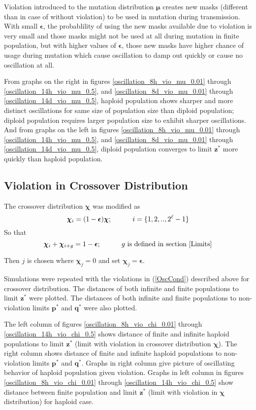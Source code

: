 Violation introduced to the mutation distribution $\bm{\mu}$ creates new masks (different than in case of without violation) to be used in mutation 
during transmission. With small $\bm{\epsilon}$, the probablility of using the new masks available due to violation is very small and 
those masks might not be used at all during mutation in finite population, but with higher values of $\bm{\epsilon}$, 
those new masks have higher chance of usage during mutation which cause oscillation to damp out quickly or cause no oscillation at all.

From graphs on the right in 
figures \ref{oscillation_8h_vio_mu_0.01} through \ref{oscillation_14h_vio_mu_0.5}, 
and \ref{oscillation_8d_vio_mu_0.01} through \ref{oscillation_14d_vio_mu_0.5}, haploid population shows sharper and 
more distinct oscillations for same size of population size than diploid population; diploid population 
requires larger population size to exhibit sharper oscillations. 
And from graphs on the left in figures \ref{oscillation_8h_vio_mu_0.01} through \ref{oscillation_14h_vio_mu_0.5}, and \ref{oscillation_8d_vio_mu_0.01} through \ref{oscillation_14d_vio_mu_0.5}, diploid population converges to limit $\bm{z}^\ast$ more quickly than haploid population. 

\subsection{Violation in Crossover Distribution}
The crossover distribution $\bm{\chi}$ was modified as
\[
\bm{\chi}_i = (1-\bm{\epsilon}) \bm{\chi} ; \hspace{30pt} i = \{1, 2,.., 2^{\ell}-1\} 
\]
So that 
\[
\bm{\chi}_i + \bm{\chi}_{i+g} = 1-\bm{\epsilon} ; \hspace{30pt} g \text{ is defined in  section } \ref{Limits}
\]

Then $j$ is chosen where $\bm{\chi}_j = 0$ and set $\bm{\chi}_j = \bm{\epsilon}$. 

Simulations were repeated with the violations in (\ref{OscCond}) described above for crossover distribution.
The distances of both infinite and finite populations to limit $\bm{z}^\ast$ were plotted. 
The distances of both infinite and finite populations to non-violation limits $\bm{p}^\ast$ and $\bm{q}^\ast$ were also plotted.


The left column of figures \ref{oscillation_8h_vio_chi_0.01} through \ref{oscillation_14h_vio_chi_0.5} 
shows distance of finite and infinite haploid populations to limit $\bm{z^\ast}$ (limit with violation in crossover distribution $\bm{\chi}$). The 
right column shows distance of finite and infinite haploid populations to non-violation limits $\bm{p^\ast}$ and $\bm{q^\ast}$. 
Graphs in right column give picture of oscillating behavior of haploid population given violation. 
Graphs in left column in figures \ref{oscillation_8h_vio_chi_0.01} through \ref{oscillation_14h_vio_chi_0.5} show distance 
between finite population and limit $\bm{z}^\ast$ (limit with violation in $\bm{\chi}$ distribution) for haploid case.

